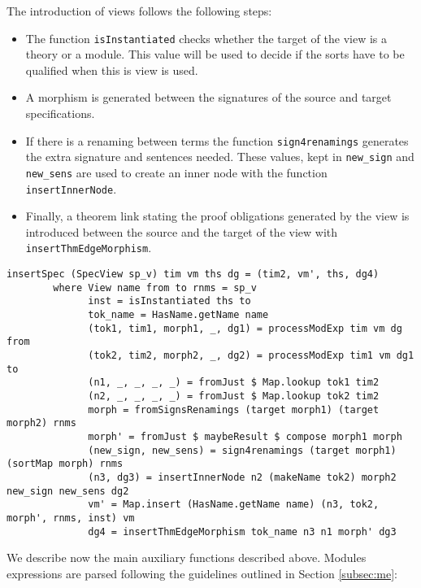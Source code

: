 The introduction of views follows the following steps:

\begin{itemize}
\item The function \verb"isInstantiated" checks whether the target of the
view is a theory or a module. This value will be used to decide if the
sorts have to be qualified when this is view is used.
\item A morphism is generated between the signatures of the source and
target specifications.
\item If there is a renaming between terms the function \verb"sign4renamings"
generates the extra signature and sentences needed. These values, kept in
\verb"new_sign" and \verb"new_sens" are used to create an inner node with
the function \verb"insertInnerNode".
\item Finally, a theorem link stating the proof obligations generated by
the view is introduced between the source and the target of the view with
\verb"insertThmEdgeMorphism".
\end{itemize}

{\codesize
\begin{verbatim}
insertSpec (SpecView sp_v) tim vm ths dg = (tim2, vm', ths, dg4)
        where View name from to rnms = sp_v
              inst = isInstantiated ths to
              tok_name = HasName.getName name
              (tok1, tim1, morph1, _, dg1) = processModExp tim vm dg from
              (tok2, tim2, morph2, _, dg2) = processModExp tim1 vm dg1 to
              (n1, _, _, _, _) = fromJust $ Map.lookup tok1 tim2
              (n2, _, _, _, _) = fromJust $ Map.lookup tok2 tim2
              morph = fromSignsRenamings (target morph1) (target morph2) rnms
              morph' = fromJust $ maybeResult $ compose morph1 morph
              (new_sign, new_sens) = sign4renamings (target morph1) (sortMap morph) rnms
              (n3, dg3) = insertInnerNode n2 (makeName tok2) morph2 new_sign new_sens dg2
              vm' = Map.insert (HasName.getName name) (n3, tok2, morph', rnms, inst) vm
              dg4 = insertThmEdgeMorphism tok_name n3 n1 morph' dg3
\end{verbatim}
}

We describe now the main auxiliary functions described above.
Modules expressions are parsed following the guidelines outlined in
Section \ref{subsec:me}:

